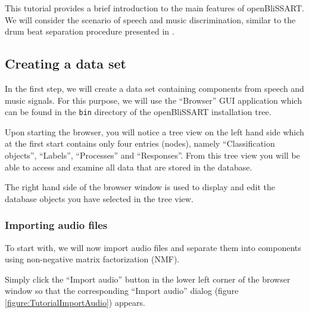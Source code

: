 %
%


This tutorial provides a brief introduction to the main features of
openBliSSART. We will consider the scenario of speech and music discrimination,
similar to the drum beat separation procedure presented in
\cite{SchullerLehmannWeninger}.


\subsection{Creating a data set}

In the first step, we will create a data set containing components from speech
and music signals. For this purpose, we will use the ``Browser'' GUI application
which can be found in the {\tt bin} directory of the openBliSSART installation
tree.

Upon starting the browser, you will notice a tree view on the left hand side
which at the first start contains only four entries (nodes), namely
``Classification objects'', ``Labels'', ``Processes'' and ``Responses''. From
this tree view you will be able to access and examine all data that are stored
in the database.

The right hand side of the browser window is used to display and edit the
database objects you have selected in the tree view.


\subsubsection{Importing audio files}

To start with, we will now import audio files and separate them into components
using non-negative matrix factorization (NMF).

Simply click the ``Import audio'' button in the lower left corner of the browser
window so that the corresponding ``Import audio'' dialog (figure
\ref{figure:TutorialImportAudio}) appears.

